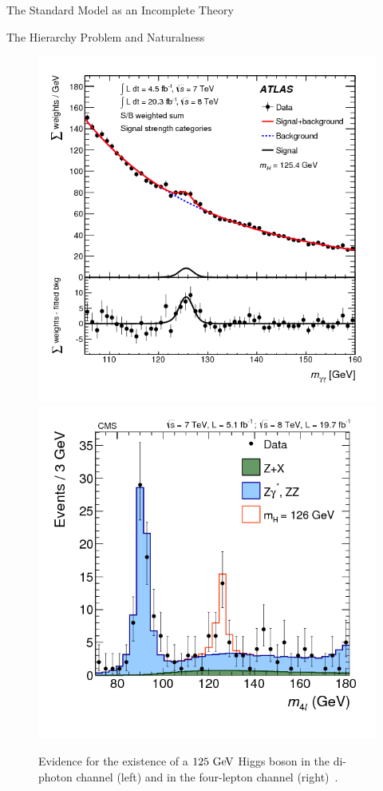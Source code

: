 \begin{section}{The Standard Model as an Incomplete Theory}
\begin{subsection}{The Hierarchy Problem and Naturalness}
\begin{figure}[tbp!]
\begin{center}
\includegraphics[angle=0,width=0.45\columnwidth]{fig/higgs_atlas.png}
\includegraphics[angle=0,width=0.45\columnwidth]{fig/higgs_cms.png}
\end{center}
\caption{Evidence for the existence of a $125~\mathrm{Ge\kern -0.1em V}$ Higgs boson in the di-photon channel (left) and in the four-lepton channel (right)~\cite{Aad:2014eha,Chatrchyan:2013mxa}.}
\label{fig:higgs_discovery}
\end{figure}


\end{subsection}
\end{section}
